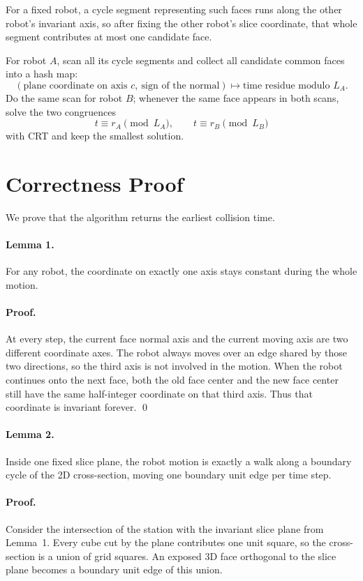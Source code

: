 \documentclass[11pt]{article}
\begin{document}
For a fixed robot, a cycle segment representing such faces runs along the other robot's invariant axis, so after fixing
the other robot's slice coordinate, that whole segment contributes at most one candidate face.

For robot $A$, scan all its cycle segments and collect all candidate common faces into a hash map:
\[
    (\text{plane coordinate on axis } c,\ \text{sign of the normal}) \mapsto \text{time residue modulo } L_A.
\]
Do the same scan for robot $B$; whenever the same face appears in both scans, solve the two congruences
\[
    t \equiv r_A \pmod{L_A}, \qquad t \equiv r_B \pmod{L_B}
\]
with CRT and keep the smallest solution.

\section*{Correctness Proof}

We prove that the algorithm returns the earliest collision time.

\paragraph{Lemma 1.}
For any robot, the coordinate on exactly one axis stays constant during the whole motion.

\paragraph{Proof.}
At every step, the current face normal axis and the current moving axis are two different coordinate axes.
The robot always moves over an edge shared by those two directions, so the third axis is not involved in the motion.
When the robot continues onto the next face, both the old face center and the new face center still have the same
half-integer coordinate on that third axis. Thus that coordinate is invariant forever. \qed

\paragraph{Lemma 2.}
Inside one fixed slice plane, the robot motion is exactly a walk along a boundary cycle of the 2D cross-section, moving
one boundary unit edge per time step.

\paragraph{Proof.}
Consider the intersection of the station with the invariant slice plane from Lemma~1.
Every cube cut by the plane contributes one unit square, so the cross-section is a union of grid squares.
An exposed 3D face orthogonal to the slice plane becomes a boundary unit edge of this union.
\end{document}
